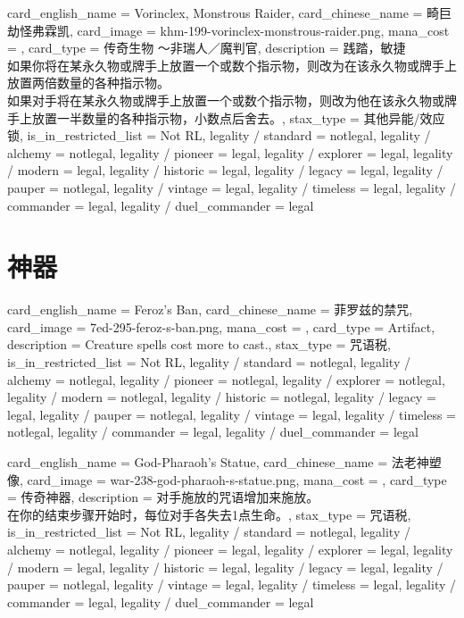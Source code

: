 \documentclass[lang = cn, color = black, 10pt]{AllThatStax}
\begin{document}
\card
{
	card_english_name = {Vorinclex, Monstrous Raider},
	card_chinese_name = {畸巨劫怪弗霖凯},
	card_image = khm-199-vorinclex-monstrous-raider.png,
	mana_cost = ,
	card_type = 传奇生物 ～非瑞人／魔判官,
	description = {践踏，敏捷\\
		如果你将在某永久物或牌手上放置一个或数个指示物，则改为在该永久物或牌手上放置两倍数量的各种指示物。\\
		如果对手将在某永久物或牌手上放置一个或数个指示物，则改为他在该永久物或牌手上放置一半数量的各种指示物，小数点后舍去。},
	stax_type = 其他异能/效应锁,
	is_in_restricted_list = Not RL,
	legality / standard = notlegal,
	legality / alchemy = notlegal,
	legality / pioneer = legal,
	legality / explorer = legal,
	legality / modern = legal,
	legality / historic = legal,
	legality / legacy = legal,
	legality / pauper = notlegal,
	legality / vintage = legal,
	legality / timeless = legal,
	legality / commander = legal,
	legality / duel_commander = legal
}

\section{神器}

\card
{
	card_english_name = {Feroz's Ban},
	card_chinese_name = {菲罗兹的禁咒},
	card_image = 7ed-295-feroz-s-ban.png,
	mana_cost = ,
	card_type = Artifact,
	description = {Creature spells cost  more to cast.},
	stax_type = 咒语税,
	is_in_restricted_list = Not RL,
	legality / standard = notlegal,
	legality / alchemy = notlegal,
	legality / pioneer = notlegal,
	legality / explorer = notlegal,
	legality / modern = notlegal,
	legality / historic = notlegal,
	legality / legacy = legal,
	legality / pauper = notlegal,
	legality / vintage = legal,
	legality / timeless = notlegal,
	legality / commander = legal,
	legality / duel_commander = legal
}

\card
{
	card_english_name = {God-Pharaoh's Statue},
	card_chinese_name = {法老神塑像},
	card_image = war-238-god-pharaoh-s-statue.png,
	mana_cost = ,
	card_type = 传奇神器,
	description = {对手施放的咒语增加来施放。\\
		在你的结束步骤开始时，每位对手各失去1点生命。},
	stax_type = 咒语税,
	is_in_restricted_list = Not RL,
	legality / standard = notlegal,
	legality / alchemy = notlegal,
	legality / pioneer = legal,
	legality / explorer = legal,
	legality / modern = legal,
	legality / historic = legal,
	legality / legacy = legal,
	legality / pauper = notlegal,
	legality / vintage = legal,
	legality / timeless = legal,
	legality / commander = legal,
	legality / duel_commander = legal
}
\end{document}
